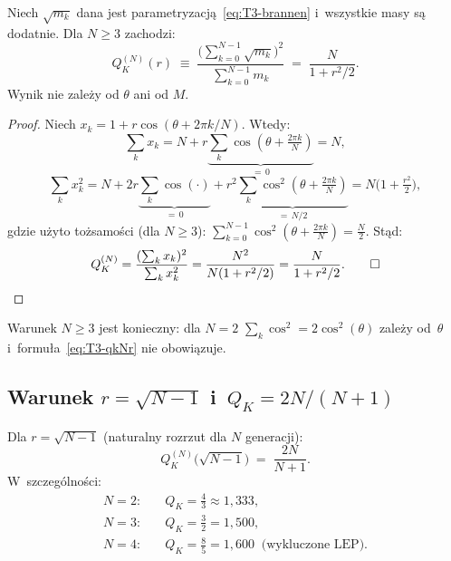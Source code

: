 \begin{proposition}\label{prop:T3-qkNr}
Niech $\sqrt{m_k}$ dana jest parametryzacj\k{a}~\eqref{eq:T3-brannen}
i~wszystkie masy s\k{a} dodatnie.  Dla $N \geq 3$ zachodzi:
\begin{equation}\label{eq:T3-qkNr}
  Q_K^{(N)}(r) \;\equiv\;
  \frac{\bigl(\sum_{k=0}^{N-1} \sqrt{m_k}\bigr)^2}{\sum_{k=0}^{N-1} m_k}
  \;=\; \frac{N}{1 + r^2/2}.
\end{equation}
Wynik nie zale\.zy od $\theta$ ani od $M$.
\end{proposition}

\begin{proof}
Niech $x_k = 1 + r\cos(\theta + 2\pi k/N)$.  Wtedy:
\[
  \sum_k x_k = N + r \underbrace{\sum_k \cos(\theta + \tfrac{2\pi k}{N})}_{=\,0} = N,
\]
\[
  \sum_k x_k^2 = N + 2r\underbrace{\sum_k \cos(\cdot)}_{=\,0}
    + r^2 \underbrace{\sum_k \cos^2(\theta + \tfrac{2\pi k}{N})}_{=\,N/2}
  = N\bigl(1 + \tfrac{r^2}{2}\bigr),
\]
gdzie u\.zyto to\.zsamo\'sci (dla $N \geq 3$):
$\sum_{k=0}^{N-1} \cos^2(\theta + \frac{2\pi k}{N}) = \frac{N}{2}$.
St\k{a}d:
\[
  Q_K^{(N)} = \frac{(\sum_k x_k)^2}{\sum_k x_k^2}
  = \frac{N^2}{N(1 + r^2/2)} = \frac{N}{1+r^2/2}.
  \qed
\]
\end{proof}

\begin{remark}
Warunek $N \geq 3$ jest konieczny: dla $N = 2$
$\sum_k\cos^2 = 2\cos^2(\theta)$ zale\.zy od~$\theta$
i~formu\l{}a~\eqref{eq:T3-qkNr} nie obowi\k{a}zuje.
\end{remark}

\subsection{Warunek $r = \sqrt{N-1}$ i~$Q_K = 2N/(N+1)$}
\label{app:T3-sqrtN1}

\begin{theorem}\label{thm:T3-sqrtN1}
Dla $r = \sqrt{N-1}$ (naturalny rozrzut dla $N$ genera\-cji):
\begin{equation}\label{eq:T3-qk-nat}
  Q_K^{(N)}\bigl(\sqrt{N-1}\bigr)
  \;=\; \frac{2N}{N+1}.
\end{equation}
W~szczeg\'olno\'sci:
\begin{align}
  N=2: &\quad Q_K = \tfrac{4}{3} \approx 1{,}333, \label{eq:T3-N2}\\
  N=3: &\quad Q_K = \tfrac{3}{2} = 1{,}500, \label{eq:T3-N3}\\
  N=4: &\quad Q_K = \tfrac{8}{5} = 1{,}600 \;\;\text{(wykluczone LEP)}. \label{eq:T3-N4}
\end{align}
\end{theorem}

